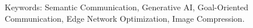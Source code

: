


\vfill
Keywords: Semantic Communication, Generative AI, Goal-Oriented Communication, Edge Network Optimization, Image Compression.

\thispagestyle{empty}
\mbox{}